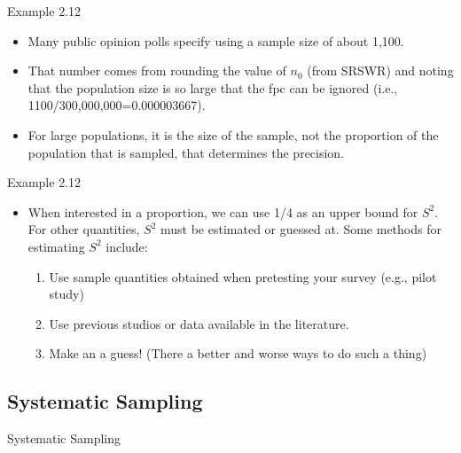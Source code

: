 \documentclass[10pt]{beamer}\usepackage[]{graphicx}\usepackage[]{xcolor}
\begin{document}
\begin{frame}{Example 2.12}

\begin{block}{}
\begin{itemize}
\item Many public opinion polls specify using a sample size of about 1,100.
\item That number comes from rounding the value of $n_0$ (from SRSWR) and noting that the population size is so large that the fpc can be ignored (i.e., 1100/300,000,000=0.000003667). 
\item For large populations, it is the size of the sample, not the proportion of the population that is sampled, that determines the precision.
\end{itemize}
\end{block}

\end{frame}

\begin{frame}{Example 2.12}

\begin{block}{}
\begin{itemize}
\item When interested in a proportion, we can use 1/4 as an upper bound for $S^2$. For other quantities, $S^2$ must be estimated or guessed at. Some methods for estimating $S^2$ include:

\begin{enumerate}
\item Use sample quantities obtained when pretesting your survey (e.g., pilot study)
\item Use previous studios or data available in the literature.
\item Make an a guess! (There a better and worse ways to do such a thing)
\end{enumerate}

\end{itemize}
\end{block}

\end{frame}


\subsection{Systematic Sampling}

\begin{frame}{}
\begin{block}{}
Systematic Sampling
\end{block}
\end{frame}
\end{document}
